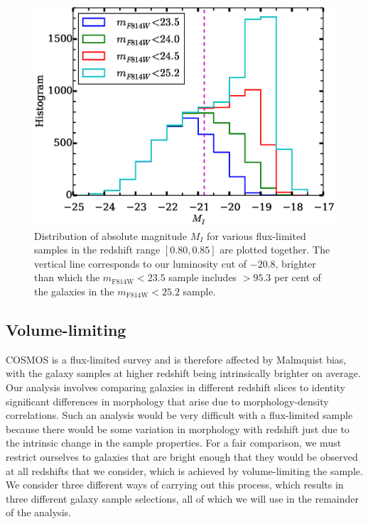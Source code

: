 \documentclass[twocolumn,useAMS,usenatbib]{mn2e}
\newcommand{\rachel}[1]{{\textcolor{red}{#1}}}
\begin{document}
\begin{figure}
  \centering
   \includegraphics[width=\columnwidth]{MAG_histograms}
   \caption{Distribution of absolute magnitude $M_I$ for various
     flux-limited samples in the redshift range $[0.80, 0.85]$ are plotted together. The vertical line
     corresponds to our luminosity cut of $-20.8$, brighter than which
     the $m_\text{F814W}<23.5$ sample includes $>95.3$ per cent of the
     galaxies in the $m_\text{F814W}<25.2$ sample.
   }
   \label{fig:MIhist}
 \end{figure}


\subsection{Volume-limiting}
\label{sub:volumelimiting}
 
COSMOS is a flux-limited survey and is therefore affected by Malmquist
bias, with the galaxy samples at higher redshift being intrinsically
brighter on average.  
Our analysis involves comparing galaxies in different redshift slices
to identity significant differences in morphology that arise due to
morphology-density correlations.  Such an analysis would be very
difficult with a flux-limited sample because there would be some
variation in morphology with redshift just due to the intrinsic change
in the sample properties.  For a fair comparison, we must restrict
ourselves to galaxies that are bright enough that they would be
observed at all redshifts that we consider, which is achieved by
volume-limiting the sample.  We consider three different ways of
carrying out this process, which results in three different galaxy
sample selections, all of which we will use in the remainder of the
analysis.
\end{document}
